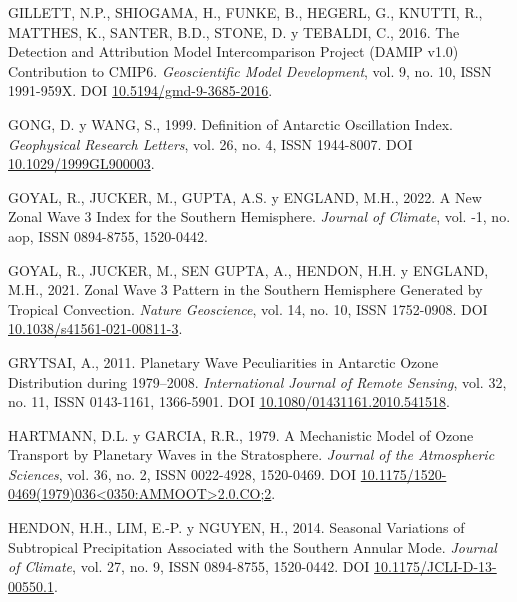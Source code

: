 \documentclass[12pt,oneside,a4paper]{reedthesis}
\newlength{\cslhangindent}
\newenvironment{CSLReferences}[2] %
 {%
  \setlength{\parindent}{0pt}
  \ifodd #1 \everypar{\setlength{\hangindent}{\cslhangindent}}\ignorespaces\fi
  \ifnum #2 > 0
  \setlength{\parskip}{#2\baselineskip}
  \fi
 }%
 {}
\begin{document}
\begin{CSLReferences}{1}{0}
\leavevmode{}%
GILLETT, N.P., SHIOGAMA, H., FUNKE, B., HEGERL, G., KNUTTI, R., MATTHES, K., SANTER, B.D., STONE, D. y TEBALDI, C., 2016. The {Detection} and {Attribution Model Intercomparison Project} ({DAMIP} v1.0) Contribution to {CMIP6}. \emph{Geoscientific Model Development}, vol. 9, no. 10, ISSN 1991-959X. DOI \href{https://doi.org/10.5194/gmd-9-3685-2016}{10.5194/gmd-9-3685-2016}.

\leavevmode{}%
GONG, D. y WANG, S., 1999. Definition of {Antarctic Oscillation} Index. \emph{Geophysical Research Letters}, vol. 26, no. 4, ISSN 1944-8007. DOI \href{https://doi.org/10.1029/1999GL900003}{10.1029/1999GL900003}.

\leavevmode{}%
GOYAL, R., JUCKER, M., GUPTA, A.S. y ENGLAND, M.H., 2022. A New Zonal Wave 3 Index for the {Southern Hemisphere}. \emph{Journal of Climate}, vol. -1, no. aop, ISSN 0894-8755, 1520-0442.

\leavevmode{}%
GOYAL, R., JUCKER, M., SEN GUPTA, A., HENDON, H.H. y ENGLAND, M.H., 2021. Zonal Wave 3 Pattern in the {Southern Hemisphere} Generated by Tropical Convection. \emph{Nature Geoscience}, vol. 14, no. 10, ISSN 1752-0908. DOI \href{https://doi.org/10.1038/s41561-021-00811-3}{10.1038/s41561-021-00811-3}.

\leavevmode{}%
GRYTSAI, A., 2011. Planetary Wave Peculiarities in {Antarctic} Ozone Distribution during 1979--2008. \emph{International Journal of Remote Sensing}, vol. 32, no. 11, ISSN 0143-1161, 1366-5901. DOI \href{https://doi.org/10.1080/01431161.2010.541518}{10.1080/01431161.2010.541518}.

\leavevmode{}%
HARTMANN, D.L. y GARCIA, R.R., 1979. A {Mechanistic Model} of {Ozone Transport} by {Planetary Waves} in the {Stratosphere}. \emph{Journal of the Atmospheric Sciences}, vol. 36, no. 2, ISSN 0022-4928, 1520-0469. DOI \href{https://doi.org/10.1175/1520-0469(1979)036\%3C0350:AMMOOT\%3E2.0.CO;2}{10.1175/1520-0469(1979)036\textless0350:AMMOOT\textgreater2.0.CO;2}.

\leavevmode{}%
HENDON, H.H., LIM, E.-P. y NGUYEN, H., 2014. Seasonal {Variations} of {Subtropical Precipitation Associated} with the {Southern Annular Mode}. \emph{Journal of Climate}, vol. 27, no. 9, ISSN 0894-8755, 1520-0442. DOI \href{https://doi.org/10.1175/JCLI-D-13-00550.1}{10.1175/JCLI-D-13-00550.1}.


\end{CSLReferences}
\end{document}

